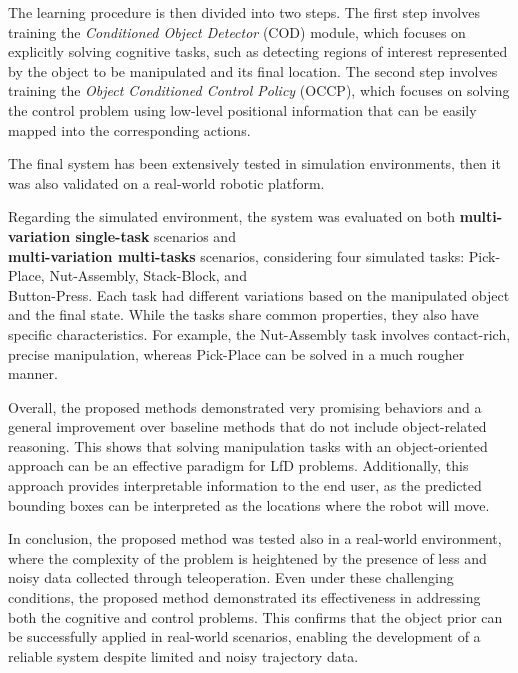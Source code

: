 The learning procedure is then divided into two steps. The first step involves training the \textit{Conditioned Object Detector} (COD) module, which focuses on explicitly solving cognitive tasks, such as detecting regions of interest represented by the object to be manipulated and its final location. The second step involves training the \textit{Object Conditioned Control Policy} (OCCP), which focuses on solving the control problem using low-level positional information that can be easily mapped into the corresponding actions.

The final system has been extensively tested in simulation environments, then it was also validated on a real-world robotic platform. 

Regarding the simulated environment, the system was evaluated on both \textbf{multi-variation single-task} scenarios and \\ \textbf{multi-variation multi-tasks} scenarios, considering four simulated tasks: Pick-Place, Nut-Assembly, Stack-Block, and \\ Button-Press. Each task had different variations based on the manipulated object and the final state. While the tasks share common properties, they also have specific characteristics. For example, the Nut-Assembly task involves contact-rich, precise manipulation, whereas Pick-Place can be solved in a much rougher manner.

Overall, the proposed methods demonstrated very promising behaviors and a general improvement over baseline methods that do not include object-related reasoning. This shows that solving manipulation tasks with an object-oriented approach can be an effective paradigm for LfD problems. Additionally, this approach provides interpretable information to the end user, as the predicted bounding boxes can be interpreted as the locations where the robot will move.

In conclusion, the proposed method was tested also in a real-world environment, where the complexity of the problem is heightened by the presence of less and noisy data collected through teleoperation. Even under these challenging conditions, the proposed method demonstrated its effectiveness in addressing both the cognitive and control problems. This confirms that the object prior can be successfully applied in real-world scenarios, enabling the development of a reliable system despite limited and noisy trajectory data.
